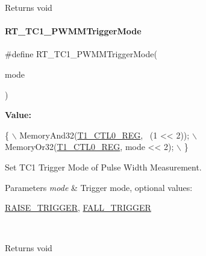 \begin{DoxyReturn}{Returns}
void 
\end{DoxyReturn}
\mbox{\label{a00080_a326645a1e9eb49468e696ba7a186cdba}} 
\paragraph{\texorpdfstring{R\+T\+\_\+\+T\+C1\+\_\+\+P\+W\+M\+M\+Trigger\+Mode}{RT\_TC1\_PWMMTriggerMode}}
{\footnotesize\ttfamily \#define R\+T\+\_\+\+T\+C1\+\_\+\+P\+W\+M\+M\+Trigger\+Mode(\begin{DoxyParamCaption}\item[{}]{mode }\end{DoxyParamCaption})}

{\bfseries Value\+:}
\begin{DoxyCode}
\{                                        \(\backslash\)
        MemoryAnd32(\mbox{\hyperlink{a00026_a55600694c3c73a1019f78d306f474fa1}{T1\_CTL0\_REG}}, ~(1 << 2)); \(\backslash\)
        MemoryOr32(\mbox{\hyperlink{a00026_a55600694c3c73a1019f78d306f474fa1}{T1\_CTL0\_REG}}, mode << 2);  \(\backslash\)
    \}
\end{DoxyCode}


Set T\+C1 Trigger Mode of Pulse Width Measurement. 


\begin{DoxyParams}{Parameters}
{\em mode} & Trigger mode, optional values\+:
\begin{DoxyCode}
\mbox{\hyperlink{a00026_abda90eda34a640b130f48a6ade23fe22}{RAISE\_TRIGGER}}, \mbox{\hyperlink{a00026_a9bbaf5b9e2125c7597249c7113b20e6c}{FALL\_TRIGGER}}
\end{DoxyCode}
 \\
\hline
\end{DoxyParams}
\begin{DoxyReturn}{Returns}
void 
\end{DoxyReturn}
\mbox{\label{a00080_afbffb90a80851e9a1e6e3dc03938c547}} 
